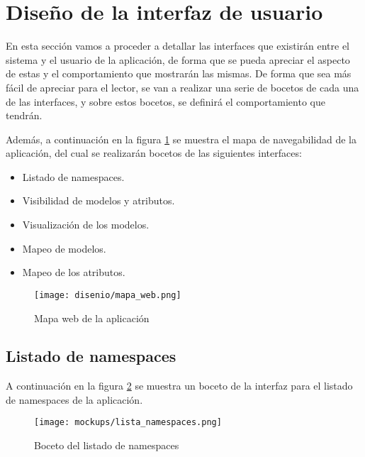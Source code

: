 \section{Diseño de la interfaz de usuario}

En esta sección vamos a proceder a detallar las interfaces que existirán entre
el sistema y el usuario de la aplicación, de forma que se pueda apreciar el
aspecto de estas y el comportamiento que mostrarán las mismas. De forma que sea
más fácil de apreciar para el lector, se van a realizar una serie de bocetos de
cada una de las interfaces, y sobre estos bocetos, se definirá el comportamiento
que tendrán.

Además, a continuación en la figura \ref{fig:mapa_web} se muestra el mapa de
navegabilidad de la aplicación, del cual se realizarán bocetos de las siguientes
interfaces:
\begin{itemize}
    \item Listado de namespaces.
    \item Visibilidad de modelos y atributos.
    \item Visualización de los modelos.
    \item Mapeo de modelos.
    \item Mapeo de los atributos. 
\end{itemize}

\begin{figure}[H]
    \begin{center}
        \texttt{[image: disenio/mapa\_web.png]}
    \end{center}
    \caption{Mapa web de la aplicación}
    \label{fig:mapa_web}
\end{figure}

\subsection{Listado de namespaces}

A continuación en la figura \ref{fig:lista_namespaces} se muestra un boceto de
la interfaz para el listado de namespaces de la aplicación.

\begin{figure}[H]
    \begin{center}
        \texttt{[image: mockups/lista\_namespaces.png]}
    \end{center}
    \caption{Boceto del listado de namespaces}
    \label{fig:lista_namespaces}
\end{figure}


